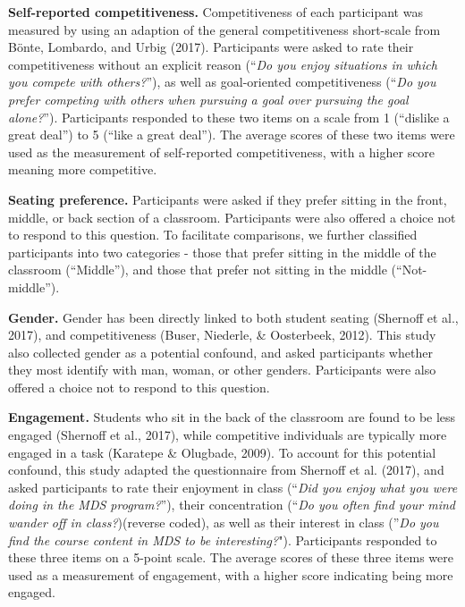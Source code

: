 \documentclass[man]{apa6}
\begin{document}
\textbf{Self-reported competitiveness.} Competitiveness of each participant was measured by using an adaption of the general competitiveness short-scale from Bönte, Lombardo, and Urbig (2017). Participants were asked to rate their competitiveness without an explicit reason (\enquote{\emph{Do you enjoy situations in which you compete with others?}}), as well as goal-oriented competitiveness (\enquote{\emph{Do you prefer competing with others when pursuing a goal over pursuing the goal alone?}}). Participants responded to these two items on a scale from 1 (\enquote{dislike a great deal}) to 5 (\enquote{like a great deal}). The average scores of these two items were used as the measurement of self-reported competitiveness, with a higher score meaning more competitive.

\textbf{Seating preference.} Participants were asked if they prefer sitting in the front, middle, or back section of a classroom. Participants were also offered a choice not to respond to this question. To facilitate comparisons, we further classified participants into two categories - those that prefer sitting in the middle of the classroom (\enquote{Middle}), and those that prefer not sitting in the middle (\enquote{Not-middle}).

\textbf{Gender.} Gender has been directly linked to both student seating (Shernoff et al., 2017), and competitiveness (Buser, Niederle, \& Oosterbeek, 2012). This study also collected gender as a potential confound, and asked participants whether they most identify with man, woman, or other genders. Participants were also offered a choice not to respond to this question.

\textbf{Engagement.} Students who sit in the back of the classroom are found to be less engaged (Shernoff et al., 2017), while competitive individuals are typically more engaged in a task (Karatepe \& Olugbade, 2009). To account for this potential confound, this study adapted the questionnaire from Shernoff et al. (2017), and asked participants to rate their enjoyment in class (\enquote{\emph{Did you enjoy what you were doing in the MDS program?}}), their concentration (\enquote{\emph{Do you often find your mind wander off in class?})(reverse coded), as well as their interest in class (}\emph{Do you find the course content in MDS to be interesting?}"). Participants responded to these three items on a 5-point scale. The average scores of these three items were used as a measurement of engagement, with a higher score indicating being more engaged.
\end{document}
